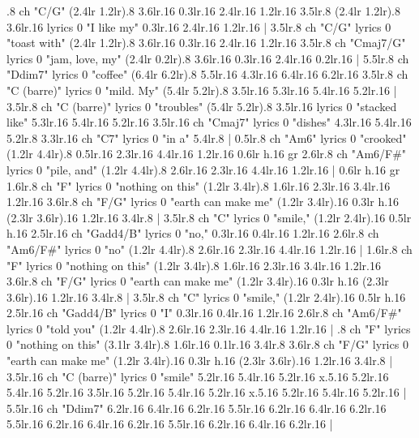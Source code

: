 .8 {ch "C/G"} (2.4{lr} 1.2{lr}).8 3.6{lr}.16 0.3{lr}.16 2.4{lr}.16 1.2{lr}.16 3.5{lr}.8 (2.4{lr} 1.2{lr}).8 3.6{lr}.16 {lyrics 0 "I like my"} 0.3{lr}.16 2.4{lr}.16 1.2{lr}.16 |
3.5{lr}.8 {ch "C/G" lyrics 0 "toast with"} (2.4{lr} 1.2{lr}).8 3.6{lr}.16 0.3{lr}.16 2.4{lr}.16 1.2{lr}.16 3.5{lr}.8 {ch "Cmaj7/G" lyrics 0 "jam, love, my"} (2.4{lr} 0.2{lr}).8 3.6{lr}.16 0.3{lr}.16 2.4{lr}.16 0.2{lr}.16 |
5.5{lr}.8 {ch "Ddim7" lyrics 0 "coffee"} (6.4{lr} 6.2{lr}).8 5.5{lr}.16 4.3{lr}.16 6.4{lr}.16 6.2{lr}.16 3.5{lr}.8 {ch "C (barre)" lyrics 0 "mild. My"} (5.4{lr} 5.2{lr}).8 3.5{lr}.16 5.3{lr}.16 5.4{lr}.16 5.2{lr}.16 |
3.5{lr}.8 {ch "C (barre)" lyrics 0 "troubles"} (5.4{lr} 5.2{lr}).8 3.5{lr}.16 {lyrics 0 "stacked like"} 5.3{lr}.16 5.4{lr}.16 5.2{lr}.16 3.5{lr}.16 {ch "Cmaj7" lyrics 0 "dishes"} 4.3{lr}.16 5.4{lr}.16 5.2{lr}.8 3.3{lr}.16 {ch "C7" lyrics 0 "in a"} 5.4{lr}.8 |
0.5{lr}.8 {ch "Am6" lyrics 0 "crooked"} (1.2{lr} 4.4{lr}).8 0.5{lr}.16 2.3{lr}.16 4.4{lr}.16 1.2{lr}.16 0.6{lr h}.16 {gr} 2.6{lr}.8 {ch "Am6/F#" lyrics 0 "pile, and"} (1.2{lr} 4.4{lr}).8 2.6{lr}.16 2.3{lr}.16 4.4{lr}.16 1.2{lr}.16 |
0.6{lr h}.16 {gr} 1.6{lr}.8 {ch "F" lyrics 0 "nothing on this"} (1.2{lr} 3.4{lr}).8 1.6{lr}.16 2.3{lr}.16 3.4{lr}.16 1.2{lr}.16 3.6{lr}.8 {ch "F/G" lyrics 0 "earth can make me"} (1.2{lr} 3.4{lr}).16 0.3{lr h}.16 (2.3{lr} 3.6{lr}).16 1.2{lr}.16 3.4{lr}.8 |
3.5{lr}.8 {ch "C" lyrics 0 "smile,"} (1.2{lr} 2.4{lr}).16 0.5{lr h}.16 2.5{lr}.16 {ch "Gadd4/B" lyrics 0 "no,"} 0.3{lr}.16 0.4{lr}.16 1.2{lr}.16 2.6{lr}.8 {ch "Am6/F#" lyrics 0 "no"} (1.2{lr} 4.4{lr}).8 2.6{lr}.16 2.3{lr}.16 4.4{lr}.16 1.2{lr}.16 |
1.6{lr}.8 {ch "F" lyrics 0 "nothing on this"} (1.2{lr} 3.4{lr}).8 1.6{lr}.16 2.3{lr}.16 3.4{lr}.16 1.2{lr}.16 3.6{lr}.8 {ch "F/G" lyrics 0 "earth can make me"} (1.2{lr} 3.4{lr}).16 0.3{lr h}.16 (2.3{lr} 3.6{lr}).16 1.2{lr}.16 3.4{lr}.8 |
3.5{lr}.8 {ch "C" lyrics 0 "smile,"} (1.2{lr} 2.4{lr}).16 0.5{lr h}.16 2.5{lr}.16 {ch "Gadd4/B" lyrics 0 "I"} 0.3{lr}.16 0.4{lr}.16 1.2{lr}.16 2.6{lr}.8 {ch "Am6/F#" lyrics 0 "told you"} (1.2{lr} 4.4{lr}).8 2.6{lr}.16 2.3{lr}.16 4.4{lr}.16 1.2{lr}.16 |
.8 {ch "F" lyrics 0 "nothing on this"} (3.1{lr} 3.4{lr}).8 1.6{lr}.16 0.1{lr}.16 3.4{lr}.8 3.6{lr}.8 {ch "F/G" lyrics 0 "earth can make me"} (1.2{lr} 3.4{lr}).16 0.3{lr h}.16 (2.3{lr} 3.6{lr}).16 1.2{lr}.16 3.4{lr}.8 |
3.5{lr}.16 {ch "C (barre)" lyrics 0 "smile"} 5.2{lr}.16 5.4{lr}.16 5.2{lr}.16 x.5.16 5.2{lr}.16 5.4{lr}.16 5.2{lr}.16 3.5{lr}.16 5.2{lr}.16 5.4{lr}.16 5.2{lr}.16 x.5.16 5.2{lr}.16 5.4{lr}.16 5.2{lr}.16 |
5.5{lr}.16 {ch "Ddim7"} 6.2{lr}.16 6.4{lr}.16 6.2{lr}.16 5.5{lr}.16 6.2{lr}.16 6.4{lr}.16 6.2{lr}.16 5.5{lr}.16 6.2{lr}.16 6.4{lr}.16 6.2{lr}.16 5.5{lr}.16 6.2{lr}.16 6.4{lr}.16 6.2{lr}.16 |
